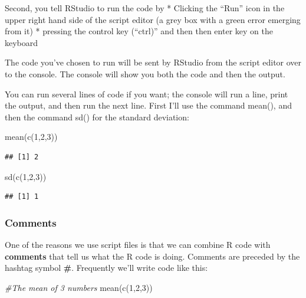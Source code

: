 \documentclass[
]{book}
\newenvironment{Shaded}{\begin{snugshade}}{\end{snugshade}}
\newcommand{\CommentTok}[1]{\textcolor[rgb]{0.56,0.35,0.01}{\textit{#1}}}
\newcommand{\DecValTok}[1]{\textcolor[rgb]{0.00,0.00,0.81}{#1}}
\newcommand{\FunctionTok}[1]{\textcolor[rgb]{0.00,0.00,0.00}{#1}}
\newcommand{\NormalTok}[1]{#1}
\begin{document}
Second, you tell RStudio to run the code by
* Clicking the ``Run'' icon in the upper right hand side of the script editor (a grey box with a green error emerging from it)
* pressing the control key (``ctrl)'' and then then enter key on the keyboard

The code you've chosen to run will be sent by RStudio from the script editor over to the console. The console will show you both the code and then the output.

You can run several lines of code if you want; the console will run a line, print the output, and then run the next line. First I'll use the command mean(), and then the command sd() for the standard deviation:

\begin{Shaded}
\begin{Highlighting}[]
\FunctionTok{mean}\NormalTok{(}\FunctionTok{c}\NormalTok{(}\DecValTok{1}\NormalTok{,}\DecValTok{2}\NormalTok{,}\DecValTok{3}\NormalTok{))}
\end{Highlighting}
\end{Shaded}

\begin{verbatim}
## [1] 2
\end{verbatim}

\begin{Shaded}
\begin{Highlighting}[]
\FunctionTok{sd}\NormalTok{(}\FunctionTok{c}\NormalTok{(}\DecValTok{1}\NormalTok{,}\DecValTok{2}\NormalTok{,}\DecValTok{3}\NormalTok{))}
\end{Highlighting}
\end{Shaded}

\begin{verbatim}
## [1] 1
\end{verbatim}

\hypertarget{comments}{%
\subsubsection{Comments}\label{comments}}

One of the reasons we use script files is that we can combine R code with \textbf{comments} that tell us what the R code is doing. Comments are preceded by the hashtag symbol \textbf{\#}. Frequently we'll write code like this:

\begin{Shaded}
\begin{Highlighting}[]
\CommentTok{\#The mean of 3 numbers}
\FunctionTok{mean}\NormalTok{(}\FunctionTok{c}\NormalTok{(}\DecValTok{1}\NormalTok{,}\DecValTok{2}\NormalTok{,}\DecValTok{3}\NormalTok{))}
\end{Highlighting}
\end{Shaded}
\end{document}
